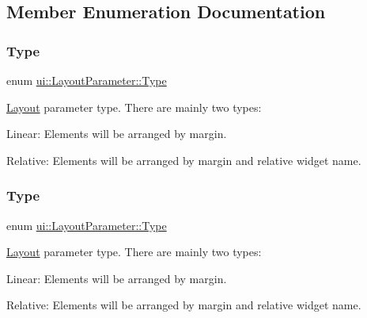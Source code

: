 \subsection{Member Enumeration Documentation}
\mbox{\label{classui_1_1LayoutParameter_a1b01e01e7e6fc3de80f2e6d07fae806e}} 
\subsubsection{\texorpdfstring{Type}{Type}\hspace{0.1cm}{\footnotesize\ttfamily [1/2]}}
{\footnotesize\ttfamily enum \hyperlink{classui_1_1LayoutParameter_a1b01e01e7e6fc3de80f2e6d07fae806e}{ui\+::\+Layout\+Parameter\+::\+Type}\hspace{0.3cm}{\ttfamily [strong]}}

\hyperlink{classui_1_1Layout}{Layout} parameter type. There are mainly two types\+:
\begin{DoxyItemize}
\item Linear\+: Elements will be arranged by margin.
\item Relative\+: Elements will be arranged by margin and relative widget name. 
\end{DoxyItemize}\mbox{\label{classui_1_1LayoutParameter_a1b01e01e7e6fc3de80f2e6d07fae806e}} 
\subsubsection{\texorpdfstring{Type}{Type}\hspace{0.1cm}{\footnotesize\ttfamily [2/2]}}
{\footnotesize\ttfamily enum \hyperlink{classui_1_1LayoutParameter_a1b01e01e7e6fc3de80f2e6d07fae806e}{ui\+::\+Layout\+Parameter\+::\+Type}\hspace{0.3cm}{\ttfamily [strong]}}

\hyperlink{classui_1_1Layout}{Layout} parameter type. There are mainly two types\+:
\begin{DoxyItemize}
\item Linear\+: Elements will be arranged by margin.
\item Relative\+: Elements will be arranged by margin and relative widget name. 
\end{DoxyItemize}

